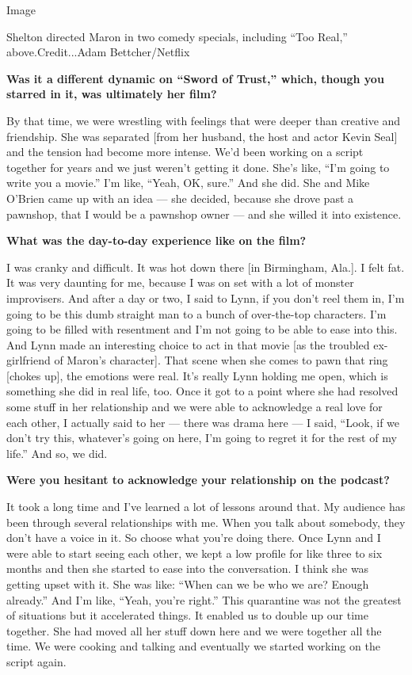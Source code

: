 Image

Shelton directed Maron in two comedy specials, including ``Too Real,''
above.Credit...Adam Bettcher/Netflix

\textbf{Was it a different dynamic on ``Sword of Trust,'' which, though
you starred in it, was ultimately her film?}

By that time, we were wrestling with feelings that were deeper than
creative and friendship. She was separated {[}from her husband, the host
and actor Kevin Seal{]} and the tension had become more intense. We'd
been working on a script together for years and we just weren't getting
it done. She's like, ``I'm going to write you a movie.'' I'm like,
``Yeah, OK, sure.'' And she did. She and Mike O'Brien came up with an
idea --- she decided, because she drove past a pawnshop, that I would be
a pawnshop owner --- and she willed it into existence.

\textbf{What was the day-to-day experience like on the film?}

I was cranky and difficult. It was hot down there {[}in Birmingham,
Ala.{]}. I felt fat. It was very daunting for me, because I was on set
with a lot of monster improvisers. And after a day or two, I said to
Lynn, if you don't reel them in, I'm going to be this dumb straight man
to a bunch of over-the-top characters. I'm going to be filled with
resentment and I'm not going to be able to ease into this. And Lynn made
an interesting choice to act in that movie {[}as the troubled
ex-girlfriend of Maron's character{]}. That scene when she comes to pawn
that ring {[}chokes up{]}, the emotions were real. It's really Lynn
holding me open, which is something she did in real life, too. Once it
got to a point where she had resolved some stuff in her relationship and
we were able to acknowledge a real love for each other, I actually said
to her --- there was drama here --- I said, ``Look, if we don't try
this, whatever's going on here, I'm going to regret it for the rest of
my life.'' And so, we did.

\textbf{Were you hesitant to acknowledge your relationship on the
podcast?}

It took a long time and I've learned a lot of lessons around that. My
audience has been through several relationships with me. When you talk
about somebody, they don't have a voice in it. So choose what you're
doing there. Once Lynn and I were able to start seeing each other, we
kept a low profile for like three to six months and then she started to
ease into the conversation. I think she was getting upset with it. She
was like: ``When can we be who we are? Enough already.'' And I'm like,
``Yeah, you're right.'' This quarantine was not the greatest of
situations but it accelerated things. It enabled us to double up our
time together. She had moved all her stuff down here and we were
together all the time. We were cooking and talking and eventually we
started working on the script again.

